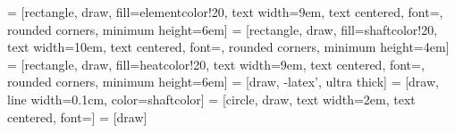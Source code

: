 \documentclass[landscape]{article}
\begin{document}
\pagestyle{empty}



 = [rectangle, draw, fill=elementcolor!20,
text width=9em, text centered, font=\LARGE, rounded corners, minimum height=6em]
 = [rectangle, draw, fill=shaftcolor!20,
text width=10em, text centered, font=\LARGE, rounded corners, minimum height=4em]
 = [rectangle, draw, fill=heatcolor!20,
text width=9em, text centered, font=\LARGE, rounded corners, minimum height=6em]
 = [draw, -latex', ultra thick]
 = [draw, line width=0.1cm, color=shaftcolor]
 = [circle, draw, text width=2em, text centered, font=\LARGE]
 = [draw]
\end{document}
